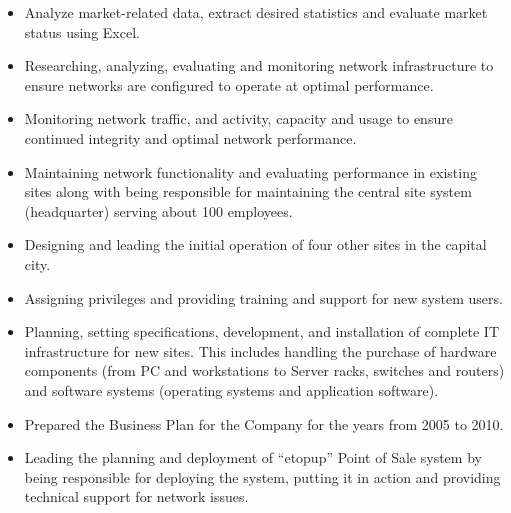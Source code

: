 \documentclass[10pt,a4paper,ragged2e]{altacv}
\begin{document}
\begin{itemize}

\item Analyze market-related data, extract desired statistics and evaluate market status using Excel.
\item Researching, analyzing, evaluating and monitoring network infrastructure to ensure networks are configured to operate at optimal performance.
\item Monitoring network traffic, and activity, capacity and usage to ensure continued integrity and optimal network performance. 
\item Maintaining network functionality and evaluating performance in existing sites along with being responsible for maintaining the central site system (headquarter) serving about 100 employees.
\item Designing and leading the initial operation of four other sites in the capital city.
\item Assigning privileges and providing training and support for new system users.
\item Planning, setting specifications, development, and installation of complete IT infrastructure for new sites. This includes handling the purchase of hardware components (from PC and workstations to Server racks, switches and routers) and software systems (operating systems and application software).
\item Prepared the Business Plan for the Company for the years from 2005 to 2010.
\item Leading the planning and deployment of “etopup” Point of Sale system by being responsible for deploying the system, putting it in action and providing technical support for network issues.
\end{itemize}


\divider
\end{document}
